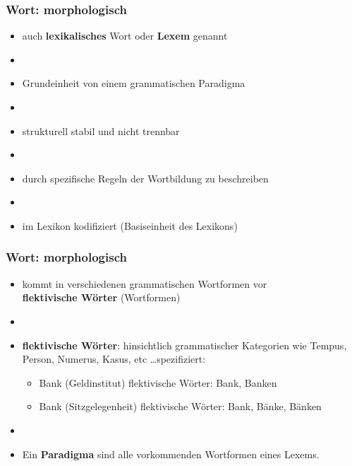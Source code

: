 \begin{frame}
\frametitle{Wort: morphologisch}

\begin{itemize}
	\item auch \textbf{lexikalisches} Wort oder \textbf{Lexem} genannt
	\item[]
	\item Grundeinheit von einem grammatischen Paradigma
	\item[]
	\item strukturell stabil und nicht trennbar
	\item[]
	\item durch spezifische Regeln der Wortbildung zu beschreiben
	\item[]
	\item im Lexikon kodifiziert (Basiseinheit des Lexikons)
\end{itemize}


\end{frame}


\begin{frame}
\frametitle{Wort: morphologisch}

\begin{itemize}
	\item kommt in verschiedenen grammatischen Wortformen vor \ras \\ 
	\textbf{flektivische Wörter} (Wortformen)
	\item[]
	\item \textbf{flektivische Wörter}: hinsichtlich grammatischer Kategorien wie
Tempus, Person, Numerus, Kasus, etc \dots spezifiziert:
	
	\begin{itemize}
		\item Bank (Geldinstitut) \ras flektivische Wörter: Bank, Banken
		\item Bank (Sitzgelegenheit) \ras flektivische Wörter: Bank, Bänke, Bänken
	\end{itemize}
	
	\item[]
	\item Ein \textbf{Paradigma} sind alle vorkommenden Wortformen eines
Lexems.
\end{itemize}


\end{frame}



